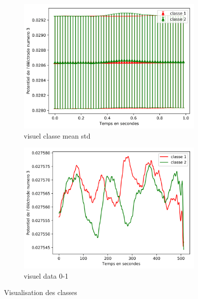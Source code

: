 \documentclass{article}[12pt]
\begin{document}
\begin{figure}
        \centering
        \begin{subfigure}[b]{0.475\textwidth}
            \centering
            \includegraphics[width=\textwidth]{images/visuel_classe_mean_std-1.png}
            \caption[Network2]%
            {{\small visuel classe mean std}}    
            \label{fig:mean and std of net14}
        \end{subfigure}
        \hfill
        \begin{subfigure}[b]{0.475\textwidth}  
            \centering 
            \includegraphics[width=\textwidth]{images/visuel_data_0-1.png}
            \caption[]%
            {{\small visuel data 0-1 }}    
            \label{fig:mean and std of net24}
        \end{subfigure}
        \caption[ Visualisation des classes]
        {\small Visualisation des classes} 
        \label{fig:mean and std of nets}
    \end{figure}
    
\end{document}

